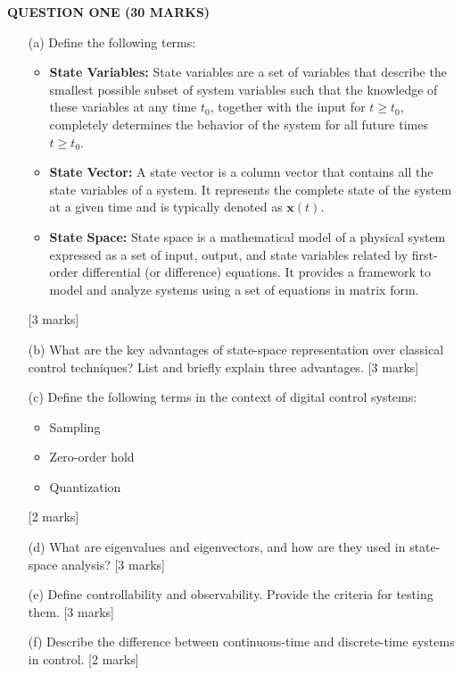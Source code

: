 \documentclass[12pt]{article}
\begin{document}
	\noindent \textbf{QUESTION ONE (30 MARKS)}
	\begin{enumerate}
		\item[(a)] Define the following terms: 
		\begin{itemize}
			\item \textbf{State Variables:} State variables are a set of variables that describe the smallest possible subset of system variables such that the knowledge of these variables at any time \( t_0 \), together with the input for \( t \geq t_0 \), completely determines the behavior of the system for all future times \( t \geq t_0 \).
			
			\item \textbf{State Vector:} A state vector is a column vector that contains all the state variables of a system. It represents the complete state of the system at a given time and is typically denoted as \( \mathbf{x}(t) \).
			
			\item \textbf{State Space:} State space is a mathematical model of a physical system expressed as a set of input, output, and state variables related by first-order differential (or difference) equations. It provides a framework to model and analyze systems using a set of equations in matrix form.
		\end{itemize}
		
		\hfill [3 marks]
		
		
		
		
		
		
		\item[(b)] What are the key advantages of state-space representation over classical control techniques? List and briefly explain three advantages. \hfill [3 marks]
		
		\item[(c)] Define the following terms in the context of digital control systems:
		\begin{itemize}
			\item Sampling
			\item Zero-order hold
			\item Quantization
		\end{itemize}
		\hfill [2 marks]
		
		\item[(d)] What are eigenvalues and eigenvectors, and how are they used in state-space analysis? \hfill [3 marks]
		
		\item[(e)] Define controllability and observability. Provide the criteria for testing them. \hfill [3 marks]
		
		\item[(f)] Describe the difference between continuous-time and discrete-time systems in control. \hfill [2 marks]
	\end{enumerate}
	
\end{document}
